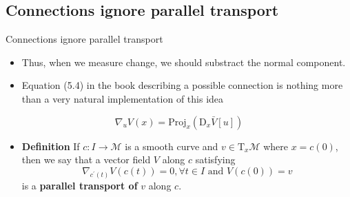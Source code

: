 \documentclass{beamer}
\begin{document}
\subsection{Connections ignore parallel transport}
\begin{frame}{Connections ignore parallel transport} 
    \begin{itemize}
        \item Thus, when we measure change, we should substract the normal component.
        \item Equation (5.4) in the book describing a possible connection is nothing more than a very natural implementation of this idea
    \end{itemize}
    \begin{equation}
        \nabla_u V(x) = \text{Proj}_x(\text{D}_x\bar{V}[u]) 
    \end{equation}
    \begin{itemize}
        \item \textbf{Definition} If $c : I\to \mathcal{M}$ is a smooth curve and $v \in \text{T}_x \mathcal{M}$ where $x = c(0)$, then we say that a vector field $V$ along $c$ satisfying 
        \begin{equation}
            \nabla_{c^\prime(t)} V(c(t))= 0, \forall t \in I \text{ and } V(c(0)) = v
        \end{equation}
        is a {\color{blue}\textbf{parallel transport of}} $v$ along $c$. 
    \end{itemize}
\end{frame}
\end{document}
